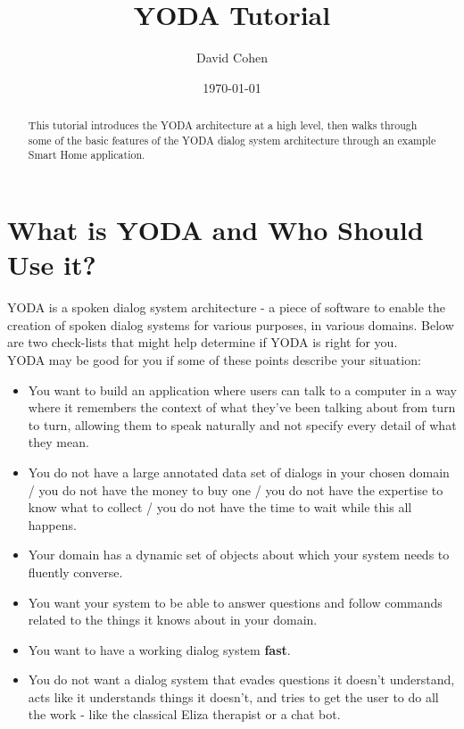 \documentclass[titlepage]{article}
\title{YODA Tutorial}
\author{David Cohen }
\date{\today}
\begin{document}
\maketitle

\tableofcontents

\begin{abstract}
This tutorial introduces the YODA architecture at a high level, then walks through some of the basic features of the YODA dialog system architecture through an example Smart Home application.
\end{abstract}



\section{What is YODA and Who Should Use it?}

YODA is a spoken dialog system architecture - a piece of software to enable the creation of spoken dialog systems for various purposes, in various domains.
Below are two check-lists that might help determine if YODA is right for you.\\


\noindent
YODA may be good for you if some of these points describe your situation:
\begin{itemize}
  \item You want to build an application where users can talk to a computer in a way where it remembers the context of what they've been talking about from turn to turn, allowing them to speak naturally and not specify every detail of what they mean.
  \item You do not have a large annotated data set of dialogs in your chosen domain / you do not have the money to buy one / you do not have the expertise to know what to collect / you do not have the time to wait while this all happens.
  \item Your domain has a dynamic set of objects about which your system needs to fluently converse.
  \item You want your system to be able to answer questions and follow commands related to the things it knows about in your domain.
  \item You want to have a working dialog system \textbf{fast}.
  \item You do not want a dialog system that evades questions it doesn't understand, acts like it understands things it doesn't, and tries to get the user to do all the work - like the classical Eliza therapist or a chat bot.
\end{itemize}
\end{document}
